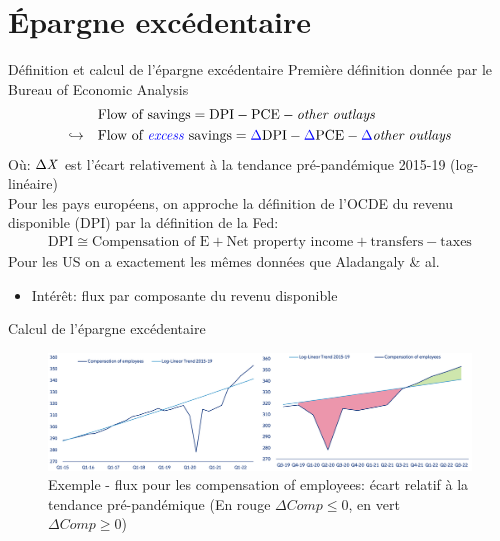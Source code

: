 \documentclass[9pt, xcolor={dvipsnames}]{beamer}
\newcommand{\blue}[1]{\textcolor{blue}{#1}}
\begin{document}
\section{Épargne excédentaire}
\begin{frame}{Définition et calcul de l'épargne excédentaire}
  Première définition donnée par le Bureau of Economic Analysis
  \begin{align*}
    &\textrm{Flow of savings} = \textrm{DPI} - \textrm{PCE} - \textrm{\textit{other outlays}} \\
    \hookrightarrow \quad &\textrm{Flow of \blue{\textit{excess}} savings} = \blue{\Delta} \textrm{DPI} - \blue{\Delta} \textrm{PCE} - \blue{\Delta} \textrm{\textit{other outlays}}
  \end{align*}
  Où: $\Delta \textrm{\textit{X}}$ est l'écart relativement à la tendance pré-pandémique 2015-19 (log-linéaire)\\
  \vspace{.3cm}
  Pour les pays européens, on approche la définition de l'OCDE du revenu disponible (DPI) par la définition de la Fed:
  \begin{align*}
    \textrm{DPI} \cong  \textrm{Compensation of E} + \textrm{Net property income} + \textrm{transfers} - \textrm{taxes}
  \end{align*}
  Pour les US on a exactement les mêmes données que Aladangaly \& al.
  \vspace{.3cm}
  \begin{itemize}
    \item Intérêt: flux par composante du revenu disponible
  \end{itemize}
\end{frame}

\begin{frame}{Calcul de l'épargne excédentaire}
  \begin{figure}
    \centering
    \includegraphics[width=1\textwidth]{img/excess_chart.png}
    \caption{Exemple - flux pour les compensation of employees: écart relatif à la tendance pré-pandémique (En rouge $\Delta Comp \leq 0$, en vert $\Delta Comp \geq  0$)}
  \end{figure}
\end{frame}
\end{document}
